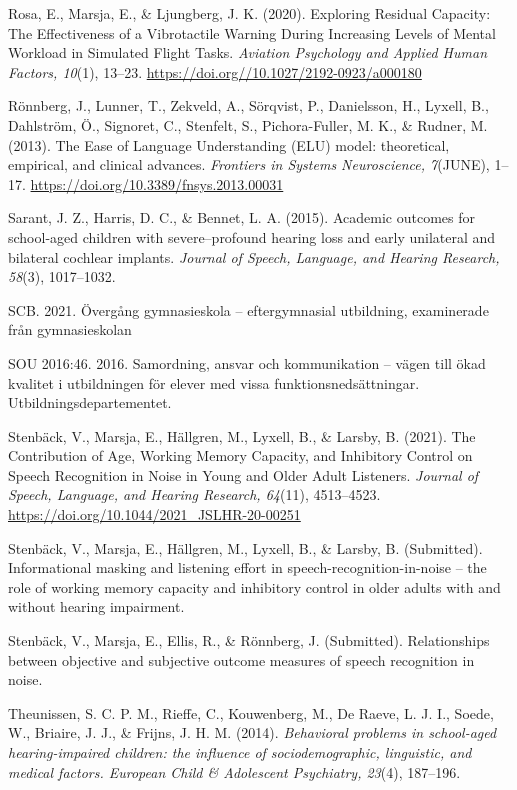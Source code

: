 \documentclass[]{article}
\begin{document}
Rosa, E., Marsja, E., \& Ljungberg, J. K. (2020). Exploring Residual
Capacity: The Effectiveness of a Vibrotactile Warning During Increasing
Levels of Mental Workload in Simulated Flight Tasks. \emph{Aviation
Psychology and Applied Human Factors, 10}(1), 13--23.
\url{https://doi.org//10.1027/2192-0923/a000180}

Rönnberg, J., Lunner, T., Zekveld, A., Sörqvist, P., Danielsson, H.,
Lyxell, B., Dahlström, Ö., Signoret, C., Stenfelt, S., Pichora-Fuller,
M. K., \& Rudner, M. (2013). The Ease of Language Understanding (ELU)
model: theoretical, empirical, and clinical advances. \emph{Frontiers in
Systems Neuroscience, 7}(JUNE), 1--17.
\url{https://doi.org/10.3389/fnsys.2013.00031}

Sarant, J. Z., Harris, D. C., \& Bennet, L. A. (2015). Academic outcomes
for school-aged children with severe--profound hearing loss and early
unilateral and bilateral cochlear implants. \emph{Journal of Speech,
Language, and Hearing Research, 58}(3), 1017--1032.

SCB. 2021. Övergång gymnasieskola -- eftergymnasial utbildning,
examinerade från gymnasieskolan

SOU 2016:46. 2016. Samordning, ansvar och kommunikation -- vägen till
ökad kvalitet i utbildningen för elever med vissa
funktionsnedsättningar. Utbildningsdepartementet.

Stenbäck, V., Marsja, E., Hällgren, M., Lyxell, B., \& Larsby, B.
(2021). The Contribution of Age, Working Memory Capacity, and Inhibitory
Control on Speech Recognition in Noise in Young and Older Adult
Listeners. \emph{Journal of Speech, Language, and Hearing Research,
64}(11), 4513--4523. \url{https://doi.org/10.1044/2021_JSLHR-20-00251}

Stenbäck, V., Marsja, E., Hällgren, M., Lyxell, B., \& Larsby, B.
(Submitted). Informational masking and listening effort in
speech-recognition-in-noise -- the role of working memory capacity and
inhibitory control in older adults with and without hearing impairment.

Stenbäck, V., Marsja, E., Ellis, R., \& Rönnberg, J. (Submitted).
Relationships between objective and subjective outcome measures of
speech recognition in noise.

Theunissen, S. C. P. M., Rieffe, C., Kouwenberg, M., De Raeve, L. J. I.,
Soede, W., Briaire, J. J., \& Frijns, J. H. M. (2014). \emph{Behavioral
problems in school-aged hearing-impaired children: the influence of
sociodemographic, linguistic, and medical factors. European Child \&
Adolescent Psychiatry, 23}(4), 187--196.
\end{document}
